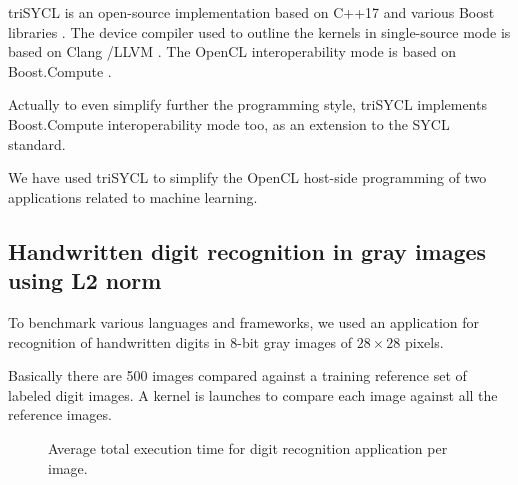 \documentclass[sigplan, review]{acmart}
\begin{document}
triSYCL \cite{triSYCL} is an open-source implementation based on C++17
and various Boost libraries \cite{Boost-1.63}. The device compiler used to
outline the kernels in single-source mode is based on Clang
\cite{Clang-4.0}/LLVM \cite{LLVM-4.0}. The OpenCL interoperability mode is
based on Boost.Compute \cite{Boost.Compute}.

Actually to even simplify further the programming style, triSYCL
implements Boost.Compute interoperability mode too, as an extension to
the SYCL standard.

We have used triSYCL to simplify the OpenCL host-side programming of
two applications related to machine learning.


\subsection{Handwritten digit recognition in gray images using L2
  norm}
\label{sec:example-from-anast}

To benchmark various languages and frameworks, we used an application
for recognition of handwritten digits in 8-bit gray images of
$28 \times 28$ pixels.

Basically there are 500 images compared against a training reference
set of labeled digit images. A kernel is launches to compare each
image against all the reference images.

\begin{figure}
  \caption{Average total execution time for digit recognition
    application per image.}
  \label{fig:results-digit-recognition}
\end{figure}
\end{document}
